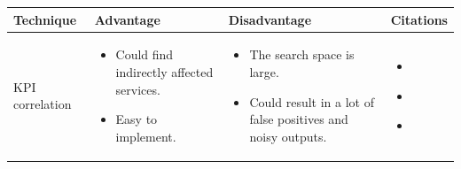 \begin{longtable}{| p{23mm} | p{42mm} | p{42mm} | p{42mm} |}
\hline
    \textbf{Technique} &
    \textbf{Advantage} &
    \textbf{Disadvantage} &
    \textbf{Citations} \\ \hline
    
    KPI correlation &
    \vspace{-8mm}
    \begin{itemize}[leftmargin=0mm,noitemsep,nolistsep,label={}] 
        \item Could find indirectly affected services.
        \item Easy to implement.
        \vspace{-7mm}
    \end{itemize} &
    \vspace{-8mm}
    \begin{itemize}[leftmargin=0mm,noitemsep,nolistsep,label={}] 
            \item The search space is large.
            \item Could result in a lot of false positives and noisy outputs. 
            \vspace{-7mm}
    \end{itemize} &
    \vspace{-8mm}
    \begin{itemize}[leftmargin=0mm,noitemsep,nolistsep,label={}] 
        \item \cite{nguyen2011pal}
        \item \cite{nguyen2013fchain}
        \item \cite{wang2020root}
        \vspace{-7mm}
    \end{itemize} \\ \hline
    

\end{longtable}

